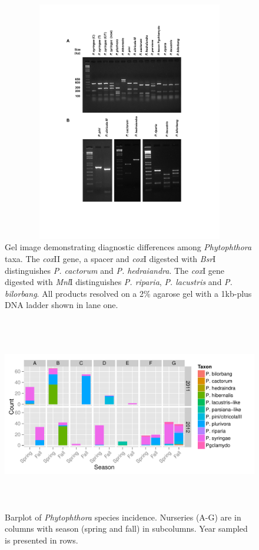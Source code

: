 \documentclass[12pt]{article}
\begin{document}
\begin{figure}[!ht]
\begin{center}
\includegraphics[trim = 0mm 0mm 0mm 110mm, clip, width=178mm, height=105mm]{Restriction_figure_v2.pdf}
\end{center}
\caption{
Gel image demonstrating diagnostic differences among \emph{Phytophthora} taxa.  The \emph{cox}II gene, a spacer and \emph{cox}I digested with \emph{Bsr}I distinguishes \emph{P. cactorum} and \emph{P. hedraiandra}.  The \emph{cox}I gene digested with \emph{Mnl}I distinguishes \emph{P. riparia}, \emph{P. lacustris} and \emph{P. bilorbang}.  All products resolved on a 2\% agarose gel with a 1kb-plus DNA ladder shown in lane one.
}
\label{fig:gel2}
\end{figure}
\clearpage



\begin{figure}[!ht]
\begin{center}
\includegraphics[width=178mm,height=85mm]{nursdiv.pdf}
\end{center}
\caption{
Barplot of \emph{Phytophthora} species incidence.  Nurseries (A-G) are in columns with season (spring and fall) in subcolumns.  Year sampled is presented in rows.
}
\label{fig:nursdiv}
\end{figure}
\clearpage
\end{document}
